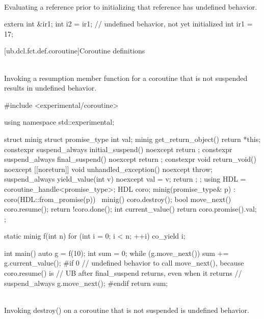 \pnum
{} \\
Evaluating a reference
prior to initializing that
reference has undefined behavior.

\pnum
\begin{example}
\begin{codeblock}
extern int &ir1;
int i2 = ir1;  // undefined behavior,  not yet initialized
int ir1 = 17;
\end{codeblock}
\end{example}




[ub.dcl.fct.def.coroutine]{Coroutine definitions}

\pnum
{} \\
Invoking a resumption member function for a coroutine that is not suspended results in undefined behavior.

\pnum
\begin{example}
\begin{codeblock}
#include <experimental/coroutine>

using namespace std::experimental;

struct minig {
  struct promise_type {
    int val;
    minig get_return_object() { return {*this}; }
    constexpr suspend_always initial_suspend() noexcept { return {}; }
    constexpr suspend_always final_suspend() noexcept { return {}; }
    constexpr void return_void() noexcept {}
    [[noreturn]] void unhandled_exception() noexcept { throw; }
    suspend_always yield_value(int v) noexcept {
      val = v;
      return {};
    }
  };
  using HDL = coroutine_handle<promise_type>;
  HDL coro;
  minig(promise_type& p) : coro(HDL::from_promise(p)) {}
  ~minig() { coro.destroy(); }
  bool move_next() {
    coro.resume();
    return !coro.done();
  }
  int current_value() { return coro.promise().val; }
};

static minig f(int n) {
  for (int i = 0; i < n; ++i)
    co_yield i;
}

int main() {
  auto g = f(10);
  int sum = 0;
  while (g.move_next())
    sum += g.current_value();
#if 0
  // undefined behavior to call move_next(), because coro.resume() is
  // UB after final_suspend returns, even when it returns
  // suspend_always
  g.move_next();
#endif
  return sum;
}
\end{codeblock}
\end{example}


\pnum
{} \\
Invoking destroy() on a coroutine that is not suspended is undefined behavior.

